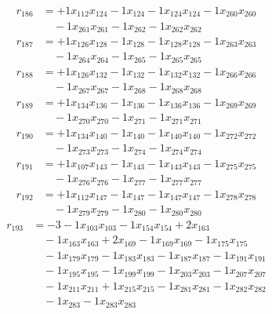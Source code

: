 \[\begin{aligned}
r_{186} &= + 1 x_{112} x_{124} - 1 x_{124} - 1 x_{124} x_{124} - 1 x_{260} x_{260} \\
 &\quad - 1 x_{261} x_{261} - 1 x_{262} - 1 x_{262} x_{262}
\end{aligned}\]
\[\begin{aligned}
r_{187} &= + 1 x_{126} x_{128} - 1 x_{128} - 1 x_{128} x_{128} - 1 x_{263} x_{263} \\
 &\quad - 1 x_{264} x_{264} - 1 x_{265} - 1 x_{265} x_{265}
\end{aligned}\]
\[\begin{aligned}
r_{188} &= + 1 x_{126} x_{132} - 1 x_{132} - 1 x_{132} x_{132} - 1 x_{266} x_{266} \\
 &\quad - 1 x_{267} x_{267} - 1 x_{268} - 1 x_{268} x_{268}
\end{aligned}\]
\[\begin{aligned}
r_{189} &= + 1 x_{134} x_{136} - 1 x_{136} - 1 x_{136} x_{136} - 1 x_{269} x_{269} \\
 &\quad - 1 x_{270} x_{270} - 1 x_{271} - 1 x_{271} x_{271}
\end{aligned}\]
\[\begin{aligned}
r_{190} &= + 1 x_{134} x_{140} - 1 x_{140} - 1 x_{140} x_{140} - 1 x_{272} x_{272} \\
 &\quad - 1 x_{273} x_{273} - 1 x_{274} - 1 x_{274} x_{274}
\end{aligned}\]
\[\begin{aligned}
r_{191} &= + 1 x_{107} x_{143} - 1 x_{143} - 1 x_{143} x_{143} - 1 x_{275} x_{275} \\
 &\quad - 1 x_{276} x_{276} - 1 x_{277} - 1 x_{277} x_{277}
\end{aligned}\]
\[\begin{aligned}
r_{192} &= + 1 x_{112} x_{147} - 1 x_{147} - 1 x_{147} x_{147} - 1 x_{278} x_{278} \\
 &\quad - 1 x_{279} x_{279} - 1 x_{280} - 1 x_{280} x_{280}
\end{aligned}\]
\[\begin{aligned}
r_{193} &= - 3 - 1 x_{103} x_{103} - 1 x_{154} x_{154} + 2 x_{163} \\
 &\quad - 1 x_{163} x_{163} + 2 x_{169} - 1 x_{169} x_{169} - 1 x_{175} x_{175} \\
 &\quad - 1 x_{179} x_{179} - 1 x_{183} x_{183} - 1 x_{187} x_{187} - 1 x_{191} x_{191} \\
 &\quad - 1 x_{195} x_{195} - 1 x_{199} x_{199} - 1 x_{203} x_{203} - 1 x_{207} x_{207} \\
 &\quad - 1 x_{211} x_{211} + 1 x_{215} x_{215} - 1 x_{281} x_{281} - 1 x_{282} x_{282} \\
 &\quad - 1 x_{283} - 1 x_{283} x_{283}
\end{aligned}\]
\endgroup
